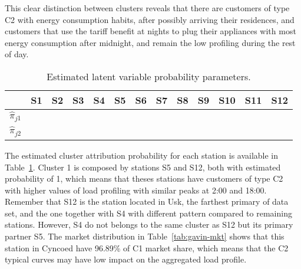 This clear distinction between clusters reveals that there are customers of type C2 with energy consumption habits, after possibly arriving their residences, and customers that use the tariff benefit at nights to plug their appliances with most energy consumption after midnight, and remain the  low profiling during the rest of day. 


\begin{table}[b]
\caption{Estimated latent variable probability parameters.}
\centering
\begin{knitrout}
\color{fgcolor}
\begin{tabular}{lllllllllllll}
\toprule
  & S1 & S2 & S3 & S4 & S5 & S6 & S7 & S8 & S9 & S10 & S11 & S12\\
\midrule
$\hat{\pi}_{j1}$ & \cellcolor[HTML]{FFFFFF}{0.42} & \cellcolor[HTML]{FFFFFF}{0.26} & \cellcolor[HTML]{FFFFFF}{0.2} & \cellcolor[HTML]{FFFFFF}{0} & \cellcolor[HTML]{CECECE}{1} & \cellcolor[HTML]{FFFFFF}{0} & \cellcolor[HTML]{FFFFFF}{0.13} & \cellcolor[HTML]{FFFFFF}{0.24} & \cellcolor[HTML]{FFFFFF}{0.22} & \cellcolor[HTML]{FFFFFF}{0.16} & \cellcolor[HTML]{FFFFFF}{0.2} & \cellcolor[HTML]{CECECE}{1}\\
$\hat{\pi}_{j2}$ & \cellcolor[HTML]{CECECE}{0.58} & \cellcolor[HTML]{CECECE}{0.74} & \cellcolor[HTML]{CECECE}{0.8} & \cellcolor[HTML]{CECECE}{1} & \cellcolor[HTML]{FFFFFF}{0} & \cellcolor[HTML]{CECECE}{1} & \cellcolor[HTML]{CECECE}{0.87} & \cellcolor[HTML]{CECECE}{0.76} & \cellcolor[HTML]{CECECE}{0.78} & \cellcolor[HTML]{CECECE}{0.84} & \cellcolor[HTML]{CECECE}{0.8} & \cellcolor[HTML]{FFFFFF}{0}\\
\bottomrule
\end{tabular}


\end{knitrout}
\label{tab:gavin-cl-pi}
\end{table}


The estimated cluster attribution probability for each station is available in Table~\ref{tab:gavin-cl-pi}. Cluster 1 is composed by stations S5 and S12, both with estimated probability of 1, which means that theses stations have customers of type C2 with higher values of load profiling with similar peaks at 2:00 and 18:00. Remember that S12 is the station located in Usk, the farthest primary of data set, and the one together with S4 with  different pattern compared to remaining stations. However, S4 do not belongs to the same cluster as S12 but its primary partner S5. The market distribution in Table~\ref{tab:gavin-mkt} shows that this station in Cyncoed have 96.89\% of C1 market share, which means that the C2 typical curves may have low impact on the aggregated load profile.

